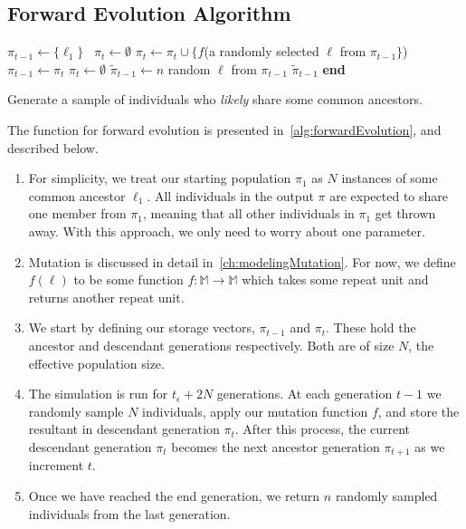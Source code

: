 \subsection{Forward Evolution Algorithm}\label{subsec:forwardEvolutionAlgorithm}
\begin{algorithm}[t]
    \SetAlgoLined
    \DontPrintSemicolon
     {
        $\pi_{t-1} \gets \{ \ell_1 \}$  \
        $\pi_t \gets \emptyset$ \;
         {
             {
                $\pi_t \gets \pi_t \cup \{f$(a randomly selected $\ell$ from $\pi_{t-1} \}$) \;
            }
            $\pi_{t-1} \gets \pi_t$ \;
            $\pi_t \gets \emptyset$ \;
        }
        $\tilde{\pi}_{t-1} \gets n$ random $\ell$ from $\pi_{t-1}$ \;
        \Return $\tilde{\pi}_{t-1}$ \;
    }
    \textbf{end} \;
    \caption{Generate a sample of individuals who \emph{likely} share some common ancestors.}
    \label{alg:forwardEvolution}
\end{algorithm}

The function for forward evolution is presented in~\autoref{alg:forwardEvolution}, and described below.
\begin{enumerate}
    \item For simplicity, we treat our starting population $\pi_1$ as $N$ instances of some common ancestor $\ell_1$.
        All individuals in the output $\pi$ are expected to share one member from $\pi_1$, meaning that all other
        individuals in $\pi_1$ get thrown away.
        With this approach, we only need to worry about one parameter.
    \item Mutation is discussed in detail in~\autoref{ch:modelingMutation}.
        For now, we define $f(\ell)$ to be some function $f : \mathbb{M} \rightarrow \mathbb{M}$ which
        takes some repeat unit and returns another repeat unit.
    \item We start by defining our storage vectors, $\pi_{t-1}$ and $\pi_t$.
        These hold the ancestor and descendant generations respectively.
        Both are of size $N$, the effective population size.
    \item The simulation is run for $t_\epsilon + 2N$ generations.
        At each generation $t - 1$ we randomly sample $N$ individuals, apply our mutation function $f$, and store the
        resultant in descendant generation $\pi_t$.
        After this process, the current descendant generation $\pi_t$ becomes the next ancestor generation $\pi_{t+1}$
        as we increment $t$.
    \item Once we have reached the end generation, we return $n$ randomly sampled individuals from the last generation.
\end{enumerate}

